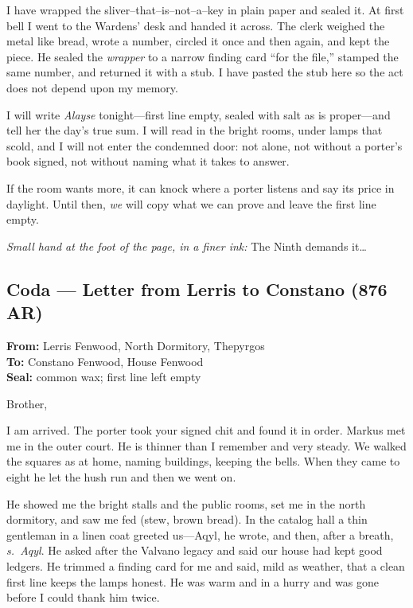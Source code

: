 \documentclass[11pt]{article}
\numberwithin{equation}{section} %
\theoremstyle{plain} %
\theoremstyle{definition} %
\theoremstyle{remark} %
\begin{document}
I have wrapped the sliver–that–is–not–a–key in plain paper and sealed it. At first bell I went to the Wardens’ desk and handed it across. The clerk weighed the metal like bread, wrote a number, circled it once and then again, and kept the piece. He sealed the \emph{wrapper} to a narrow finding card “for the file,” stamped the same number, and returned it with a stub. I have pasted the stub here so the act does not depend upon my memory.

I will write \textit{Alayse} tonight—first line empty, sealed with salt as is proper—and tell her the day’s true sum. I will read in the bright rooms, under lamps that scold, and I will not enter the condemned door: not alone, not without a porter’s book signed, not without naming what it takes to answer.

If the room wants more, it can knock where a porter listens and say its price in daylight. Until then, \textit{we} will copy what we can prove and leave the first line empty.

\medskip
\noindent\textit{Small hand at the foot of the page, in a finer ink:} The Ninth demands it\ldots{}

\subsection*{Coda — Letter from Lerris to Constano (876 AR)}

\noindent\textbf{From:} Lerris Fenwood, North Dormitory, Thepyrgos \\
\textbf{To:} Constano Fenwood, House Fenwood \\
\textbf{Seal:} common wax; first line left empty

\medskip
\noindent Brother,

I am arrived. The porter took your signed chit and found it in order. Markus met me in the outer court. He is thinner than I remember and very steady. We walked the squares as at home, naming buildings, keeping the bells. When they came to eight he let the hush run and then we went on.

He showed me the bright stalls and the public rooms, set me in the north dormitory, and saw me fed (stew, brown bread). In the catalog hall a thin gentleman in a linen coat greeted us—Aqyl, he wrote, and then, after a breath, \emph{s.\ Aqyl}. He asked after the Valvano legacy and said our house had kept good ledgers. He trimmed a finding card for me and said, mild as weather, that a clean first line keeps the lamps honest. He was warm and in a hurry and was gone before I could thank him twice.
\end{document}
